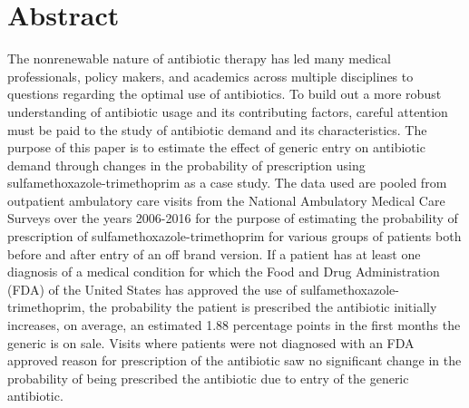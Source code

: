 \chapter*{Abstract} %
The nonrenewable nature of antibiotic therapy has led many medical professionals, policy makers, and academics across multiple disciplines to questions regarding the optimal use of antibiotics. To build out a more robust understanding of antibiotic usage and its contributing factors, careful attention must be paid to the study of antibiotic demand and its characteristics. The purpose of this paper is to estimate the effect of generic entry on antibiotic demand through changes in the probability of prescription using sulfamethoxazole-trimethoprim as a case study. The data used are pooled from outpatient ambulatory care visits from the National Ambulatory Medical Care Surveys over the years 2006-2016 for the purpose of estimating the probability of prescription of sulfamethoxazole-trimethoprim for various groups of patients both before and after entry of an off brand version. If a patient has at least one diagnosis of a medical condition for which the Food and Drug Administration (FDA) of the United States has approved the use of sulfamethoxazole-trimethoprim, the probability the patient is prescribed the antibiotic initially increases, on average, an estimated 1.88 percentage points in the first months the generic is on sale. Visits where patients were not diagnosed with an FDA approved reason for prescription of the antibiotic saw no significant change in the probability of being prescribed the antibiotic due to entry of the generic antibiotic.